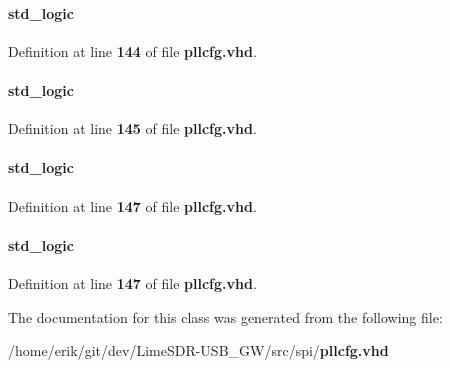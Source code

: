 \paragraph[{mem\+\_\+weA}]{ {\bfseries \textcolor{comment}{std\+\_\+logic}\textcolor{vhdlchar}{ }} \hspace{0.3cm}{\ttfamily [Signal]}}\label{classpllcfg_1_1pllcfg__arch_aa3eaa5695cd8eb6ec3950ee7cbf06824}


Definition at line {\bf 144} of file {\bf pllcfg.\+vhd}.

\paragraph[{mem\+\_\+weB}]{ {\bfseries \textcolor{comment}{std\+\_\+logic}\textcolor{vhdlchar}{ }} \hspace{0.3cm}{\ttfamily [Signal]}}\label{classpllcfg_1_1pllcfg__arch_a184599e8f5da454ae73b6fbe4fdbb48e}


Definition at line {\bf 145} of file {\bf pllcfg.\+vhd}.

\paragraph[{oeA}]{ {\bfseries \textcolor{comment}{std\+\_\+logic}\textcolor{vhdlchar}{ }} \hspace{0.3cm}{\ttfamily [Signal]}}\label{classpllcfg_1_1pllcfg__arch_a8a0f6f0f96943186a5efa8cb98c6e821}


Definition at line {\bf 147} of file {\bf pllcfg.\+vhd}.

\paragraph[{oeB}]{ {\bfseries \textcolor{comment}{std\+\_\+logic}\textcolor{vhdlchar}{ }} \hspace{0.3cm}{\ttfamily [Signal]}}\label{classpllcfg_1_1pllcfg__arch_a5e80b5e221a16b8a0b5dc9e37ea97d74}


Definition at line {\bf 147} of file {\bf pllcfg.\+vhd}.



The documentation for this class was generated from the following file\+:\begin{DoxyCompactItemize}
\item 
/home/erik/git/dev/\+Lime\+S\+D\+R-\/\+U\+S\+B\+\_\+\+G\+W/src/spi/{\bf pllcfg.\+vhd}\end{DoxyCompactItemize}

